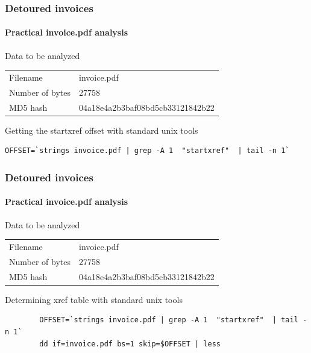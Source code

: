 \begin{frame}[fragile]
    \frametitle{Detoured invoices}
    \framesubtitle{Practical invoice.pdf analysis}
    \begin{block}{Data to be analyzed}
        \begin{tabular}{ll}
            Filename &   invoice.pdf\\
            Number of bytes & 27758\\
            MD5 hash &  04a18e4a2b3baf08bd5cb33121842b22
        \end{tabular}
    \end{block}

    \begin{block}{Getting the startxref offset with standard unix tools}
        \begin{lstlisting}
OFFSET=`strings invoice.pdf | grep -A 1  "startxref"  | tail -n 1`
        \end{lstlisting}
    \end{block}
\end{frame}

\begin{frame}[fragile]
    \frametitle{Detoured invoices}
    \framesubtitle{Practical invoice.pdf analysis}
    \begin{block}{Data to be analyzed}
        \begin{tabular}{ll}
            Filename &   invoice.pdf\\
            Number of bytes & 27758\\
            MD5 hash &  04a18e4a2b3baf08bd5cb33121842b22
        \end{tabular}
    \end{block}

    \begin{block}{Determining xref table with standard unix tools}
        \begin{lstlisting}
        OFFSET=`strings invoice.pdf | grep -A 1  "startxref"  | tail -n 1`
        dd if=invoice.pdf bs=1 skip=$OFFSET | less
        \end{lstlisting}
    \end{block}
\end{frame}


